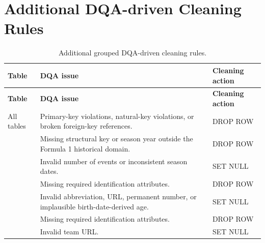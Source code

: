 \documentclass[11pt,a4paper]{article}
\begin{document}
	
	\newpage


	\section{Additional DQA-driven Cleaning Rules}
	\label{appendix:dqa-cleaning-rules}
	
	\vspace{4em}
	
	\begin{longtable}{
			>{\centering\arraybackslash}m{2.6cm}
			>{\raggedright\arraybackslash}m{7.0cm}
			>{\raggedright\arraybackslash}m{5.3cm}
		}
		\caption{Additional grouped DQA-driven cleaning rules.}
		\label{tab:appendix-dqa-cleaning-rules} \\
		\toprule
		\textbf{Table}
		& \textbf{DQA issue}
		& \textbf{Cleaning action} \\
		\midrule
		\endfirsthead
		
		\toprule
		\textbf{Table}
		& \textbf{DQA issue}
		& \textbf{Cleaning action} \\
		\midrule
		\endhead
		
		\bottomrule
		\endfoot
		
		All tables
		& Primary-key violations, natural-key violations, or broken foreign-key references.
		& DROP ROW \\
		
		\midrule
		
		\multirow{2}{*}{season}
		& Missing structural key or season year outside the Formula 1 historical domain.
		& DROP ROW \\
		\cmidrule(l){2-3}
		
		& Invalid number of events or inconsistent season dates.
		& SET NULL \\
		
		\midrule
		
		\multirow{2}{*}{driver}
		& Missing required identification attributes.
		& DROP ROW \\
		\cmidrule(l){2-3}
		
		& Invalid abbreviation, URL, permanent number, or implausible birth-date-derived age.
		& SET NULL \\
		
		\midrule
		
		\multirow{2}{*}{team}
		& Missing required identification attributes.
		& DROP ROW \\
		\cmidrule(l){2-3}
		
		& Invalid team URL.
		& SET NULL \\
		

\end{longtable}
\end{document}
